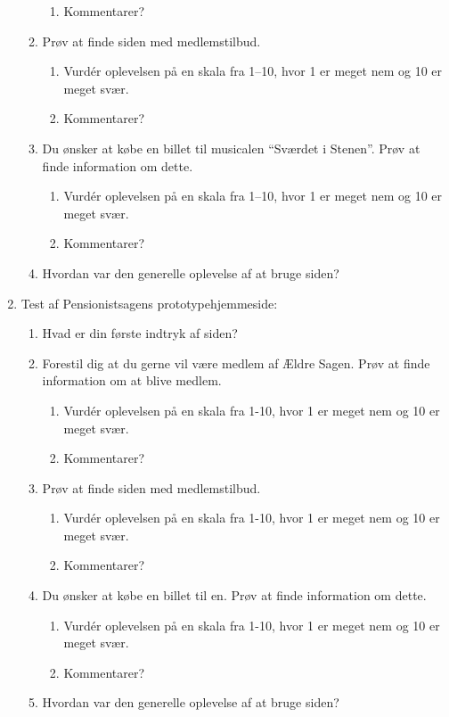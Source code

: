 \begin{enumerate}
\begin{enumerate}
\begin{enumerate}
            \item Kommentarer?
        \end{enumerate}
        \item Prøv at finde siden med medlemstilbud.
        \begin{enumerate}
            \item Vurdér oplevelsen på en skala fra 1--10, hvor 1 er meget nem og 10 er meget svær.
            \item Kommentarer?
        \end{enumerate}
        \item Du ønsker at købe en billet til musicalen ``Sværdet i Stenen''. Prøv at finde information om dette.
        \begin{enumerate}
            \item Vurdér oplevelsen på en skala fra 1--10, hvor 1 er meget nem og 10 er meget svær.
            \item Kommentarer?
        \end{enumerate}
        \item Hvordan var den generelle oplevelse af at bruge siden?
    \end{enumerate}
    \item Test af Pensionistsagens prototypehjemmeside:
    \begin{enumerate}
        \item Hvad er din første indtryk af siden?
        \item Forestil dig at du gerne vil være medlem af Ældre Sagen. Prøv at finde information om at blive medlem.
        \begin{enumerate}
            \item Vurdér oplevelsen på en skala fra 1-10, hvor 1 er meget nem og 10 er meget svær.
            \item Kommentarer?
        \end{enumerate}
        \item Prøv at finde siden med medlemstilbud.
        \begin{enumerate}
            \item Vurdér oplevelsen på en skala fra 1-10, hvor 1 er meget nem og 10 er meget svær.
            \item Kommentarer?
        \end{enumerate}
        \item Du ønsker at købe en billet til en. Prøv at finde information om dette.
        \begin{enumerate}
            \item Vurdér oplevelsen på en skala fra 1-10, hvor 1 er meget nem og 10 er meget svær.
            \item Kommentarer?
        \end{enumerate}
        \item Hvordan var den generelle oplevelse af at bruge siden?
    \end{enumerate}
\end{enumerate}
